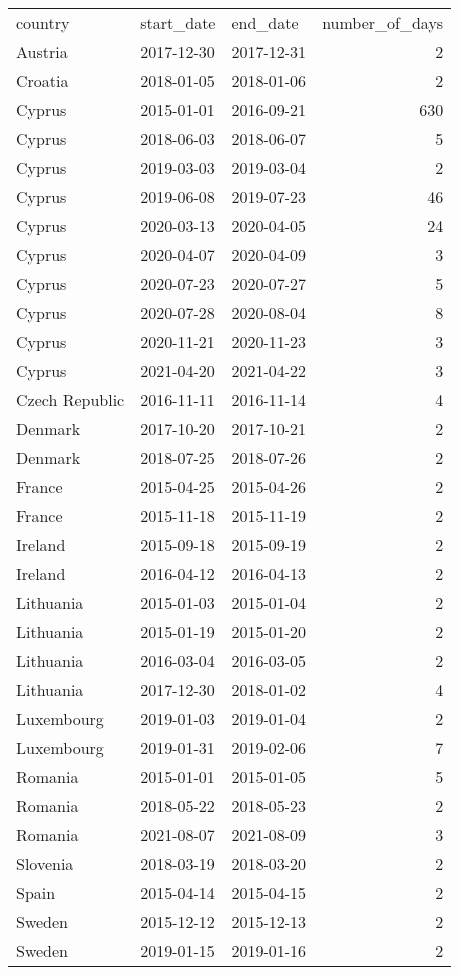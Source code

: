 \begin{tabular}{lllr}
country & start_date & end_date & number_of_days \\
Austria & 2017-12-30 & 2017-12-31 & 2 \\
Croatia & 2018-01-05 & 2018-01-06 & 2 \\
Cyprus & 2015-01-01 & 2016-09-21 & 630 \\
Cyprus & 2018-06-03 & 2018-06-07 & 5 \\
Cyprus & 2019-03-03 & 2019-03-04 & 2 \\
Cyprus & 2019-06-08 & 2019-07-23 & 46 \\
Cyprus & 2020-03-13 & 2020-04-05 & 24 \\
Cyprus & 2020-04-07 & 2020-04-09 & 3 \\
Cyprus & 2020-07-23 & 2020-07-27 & 5 \\
Cyprus & 2020-07-28 & 2020-08-04 & 8 \\
Cyprus & 2020-11-21 & 2020-11-23 & 3 \\
Cyprus & 2021-04-20 & 2021-04-22 & 3 \\
Czech Republic & 2016-11-11 & 2016-11-14 & 4 \\
Denmark & 2017-10-20 & 2017-10-21 & 2 \\
Denmark & 2018-07-25 & 2018-07-26 & 2 \\
France & 2015-04-25 & 2015-04-26 & 2 \\
France & 2015-11-18 & 2015-11-19 & 2 \\
Ireland & 2015-09-18 & 2015-09-19 & 2 \\
Ireland & 2016-04-12 & 2016-04-13 & 2 \\
Lithuania & 2015-01-03 & 2015-01-04 & 2 \\
Lithuania & 2015-01-19 & 2015-01-20 & 2 \\
Lithuania & 2016-03-04 & 2016-03-05 & 2 \\
Lithuania & 2017-12-30 & 2018-01-02 & 4 \\
Luxembourg & 2019-01-03 & 2019-01-04 & 2 \\
Luxembourg & 2019-01-31 & 2019-02-06 & 7 \\
Romania & 2015-01-01 & 2015-01-05 & 5 \\
Romania & 2018-05-22 & 2018-05-23 & 2 \\
Romania & 2021-08-07 & 2021-08-09 & 3 \\
Slovenia & 2018-03-19 & 2018-03-20 & 2 \\
Spain & 2015-04-14 & 2015-04-15 & 2 \\
Sweden & 2015-12-12 & 2015-12-13 & 2 \\
Sweden & 2019-01-15 & 2019-01-16 & 2 \\
\end{tabular}
